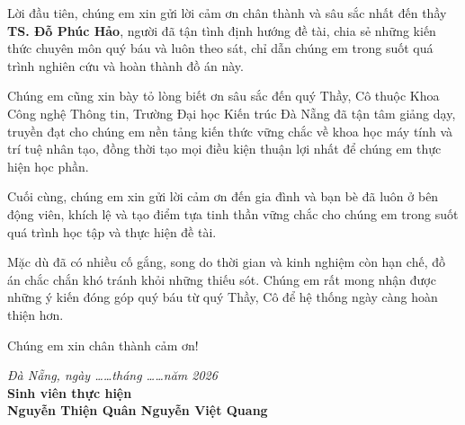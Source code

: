 Lời đầu tiên, chúng em xin gửi lời cảm ơn chân thành và sâu sắc nhất đến thầy \textbf{TS. Đỗ Phúc Hảo}, người đã tận tình định hướng đề tài, chia sẻ những kiến thức chuyên môn quý báu và luôn theo sát, chỉ dẫn chúng em trong suốt quá trình nghiên cứu và hoàn thành đồ án này.

Chúng em cũng xin bày tỏ lòng biết ơn sâu sắc đến quý Thầy, Cô thuộc Khoa Công nghệ Thông tin, Trường Đại học Kiến trúc Đà Nẵng đã tận tâm giảng dạy, truyền đạt cho chúng em nền tảng kiến thức vững chắc về khoa học máy tính và trí tuệ nhân tạo, đồng thời tạo mọi điều kiện thuận lợi nhất để chúng em thực hiện học phần.

Cuối cùng, chúng em xin gửi lời cảm ơn đến gia đình và bạn bè đã luôn ở bên động viên, khích lệ và tạo điểm tựa tinh thần vững chắc cho chúng em trong suốt quá trình học tập và thực hiện đề tài.

Mặc dù đã có nhiều cố gắng, song do thời gian và kinh nghiệm còn hạn chế, đồ án chắc chắn khó tránh khỏi những thiếu sót. Chúng em rất mong nhận được những ý kiến đóng góp quý báu từ quý Thầy, Cô để hệ thống ngày càng hoàn thiện hơn.

Chúng em xin chân thành cảm ơn!

\vspace{1.5cm}

\begin{flushright}
\textit{Đà Nẵng, ngày \dots\dots tháng \dots\dots năm 2026}\\[0.3cm]
\textbf{Sinh viên thực hiện}\\[2cm]
\textbf{Nguyễn Thiện Quân \hspace{1.5cm} Nguyễn Việt Quang}
\end{flushright}